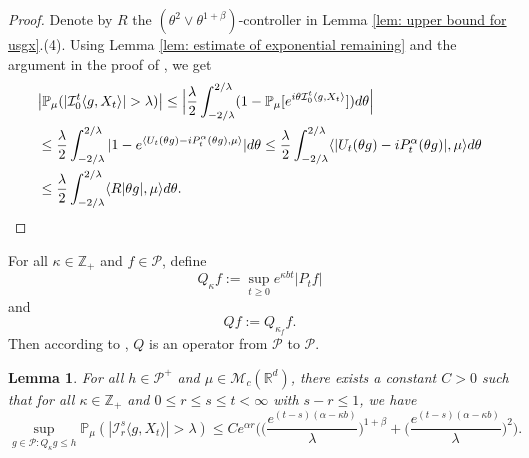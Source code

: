 \documentclass[12pt,a4paper]{amsart}
\theoremstyle{plain}
\newtheorem{lem}[thm]{Lemma}
\theoremstyle{definition}
\numberwithin{equation}{section}
\begin{document}
\begin{proof}
    Denote by $R$ the $(\theta^2\vee\theta^{1+\beta})$-controller in Lemma \ref{lem: upper bound for usgx}.(4).
    Using Lemma \ref{lem: estimate of exponential remaining} and the argument in the proof of \cite[Theorem 3.3.6]{Durrett2010Probability}, we get
\begin{equation}\begin{split}
    &\big|\mathbb P_\mu (|\mathcal{I}_0^t\langle g,X_t\rangle| > \lambda)\big|
    \leq \Big|\frac{\lambda}{2}\int_{-2/\lambda}^{2/\lambda}(1 - \mathbb P_\mu[e^{i\theta \mathcal{I}_0^t\langle g,X_t\rangle}])d\theta\Big|
    \\&\leq \frac{\lambda}{2}\int_{-2/\lambda}^{2/\lambda}|1-e^{\langle U_t(\theta g)-iP^\alpha_t (\theta g),\mu \rangle}|d\theta
    \leq \frac{\lambda}{2}\int_{-2/\lambda}^{2/\lambda}\langle |U_t(\theta g) - iP^\alpha_t(\theta g)|,\mu\rangle d\theta
    \\&\leq \frac{\lambda}{2}\int_{-2/\lambda}^{2/\lambda}\langle R|\theta g|,\mu\rangle d\theta.
      \qedhere
\end{split}\end{equation}
\end{proof}
    For all $\kappa \in \mathbb Z_+$ and $f\in \mathcal P$, define
\begin{equation}\label{Q_k}
Q_\kappa f := \sup_{t\geq 0} e^{\kappa b t}|P_t f|
\end{equation}
and
\begin{equation}\label{Q}
Q f:= Q_{\kappa_f}f.
\end{equation}
    Then according to \cite[Fact 1.2]{MM}, $Q$ is an operator from $\mathcal P$ to $\mathcal P$.
\begin{lem}\label{lem: temp}
    For all $h \in \mathcal P^+$ and $\mu \in \mathcal M_c(\mathbb R^d)$, there exists a constant $C > 0$ such that for all $\kappa \in \mathbb Z_+ $ and $0\leq r\leq s\leq t<\infty$ with $s-r \leq 1$, we have
\[
    \sup_{g \in \mathcal P: Q_\kappa g\leq h}\mathbb P_{\mu}(|\mathcal I_r^s\langle g, X_t\rangle|>\lambda)
       \leq C e^{\alpha r} \bigg(\Big( \frac{e^{(t-s)(\alpha - \kappa b)}}{\lambda}\Big)^{1+\beta} + \Big( \frac{e^{(t-s)(\alpha - \kappa b)}}{\lambda}\Big)^{2} \bigg).
\]
   \end{lem}
\end{document}
